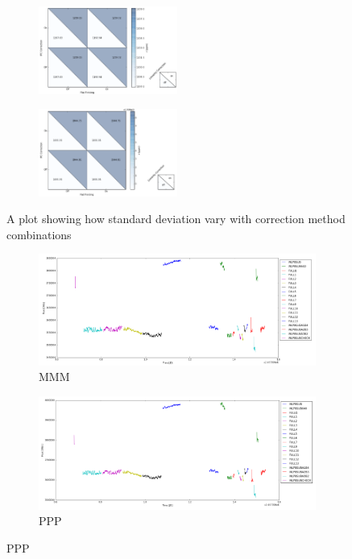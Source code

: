 \documentclass[conference]{IEEEtran}
\begin{document}
\begin{figure}[H]
    \begin{subfigure}{3}
        \includegraphics[width=0.5\textwidth]{correction2}
    \end{subfigure}
    
    \begin{subfigure}{4}
        \includegraphics[width=0.5\textwidth]{correction3}
    \end{subfigure}
    \caption{A plot showing how standard deviation vary with correction method combinations}
\end{figure}


\begin{figure}[H]
    \centering
    \begin{subfigure}{1}
        \includegraphics[scale = 0.3]{MMM}
        \caption{MMM}
    \end{subfigure}

    \begin{subfigure}{2}
        \includegraphics[scale=0.3]{PPP}
        \caption{PPP}
    \end{subfigure}
\end{figure}
\end{document}
